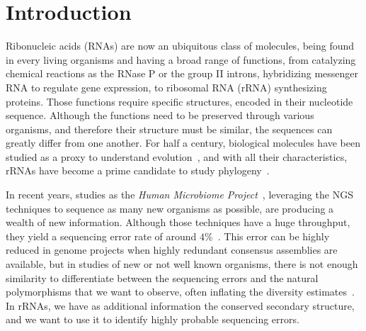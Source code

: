 \section{Introduction}
\label{sec:introduction}

Ribonucleic acids (RNAs) are  now  an ubiquitous class of molecules, being
found in every living organisms and having a broad range of functions, from catalyzing
chemical reactions as the RNase P or the group II introns,
hybridizing  messenger RNA to regulate gene expression,
to ribosomal RNA (rRNA) synthesizing proteins.
Those functions  require specific structures, 
encoded in their nucleotide sequence. Although the functions
need to be preserved through various organisms, and therefore
their structure must be similar,  the sequences
can greatly differ from one another.
For half a century, biological molecules have been studied as a proxy to understand
evolution~\cite{Zuckerkandl1965}, and with all their characteristics, rRNAs have
become a prime candidate to study phylogeny~\cite{Olsen1986, Olsen1993}.

In recent years, studies as the \emph{Human Microbiome Project}~\cite{Turnbaugh2007}, 
leveraging the NGS techniques to sequence as many new organisms 
as possible, are producing a wealth of new information. Although
those techniques have a huge throughput, they yield a sequencing error rate of around
$4\%$~\cite{Huse2007}. This error can be highly reduced in genome projects when highly 
redundant consensus 
assemblies are available, but in studies of new or not well known organisms, there is not
 enough  similarity to differentiate between the sequencing errors and the natural 
 polymorphisms that we want to observe, often inflating the diversity estimates~\cite{Kunin2010}.
  In rRNAs, we have as additional 
 information the conserved secondary structure, and we want to use it to identify
highly probable sequencing errors.
 
 